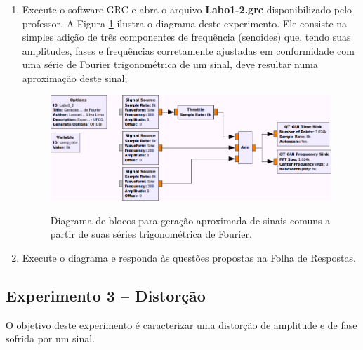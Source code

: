 \documentclass[12pt,addpoints]{exam}
\newcommand{\myscale}{0.4}
\begin{document}
\begin{enumerate}
    \item Execute o software GRC e abra o arquivo \textbf{Labo1-2.grc} disponibilizado pelo professor. A Figura \ref{fig:GRC_1-2} ilustra o diagrama deste experimento. Ele consiste na simples adição de três componentes de frequência (senoides) que, tendo suas amplitudes, fases e frequências corretamente ajustadas em conformidade com uma série de Fourier trigonométrica de um sinal, deve resultar numa aproximação deste sinal;
    \begin{figure}[htb]
        \centering
        \includegraphics[scale=\myscale]{./Figuras/GRC_1-2} \\
        \caption{Diagrama de blocos para geração aproximada de sinais comuns a partir de suas séries trigonométrica de Fourier.} 
        \label{fig:GRC_1-2}
    \end{figure}
    \item Execute o diagrama e responda às questões propostas na Folha de Respostas.
\end{enumerate}

\subsection{Experimento 3 -- Distorção}

O objetivo deste experimento é caracterizar uma distorção de amplitude e de fase sofrida por um sinal.
\end{document}
